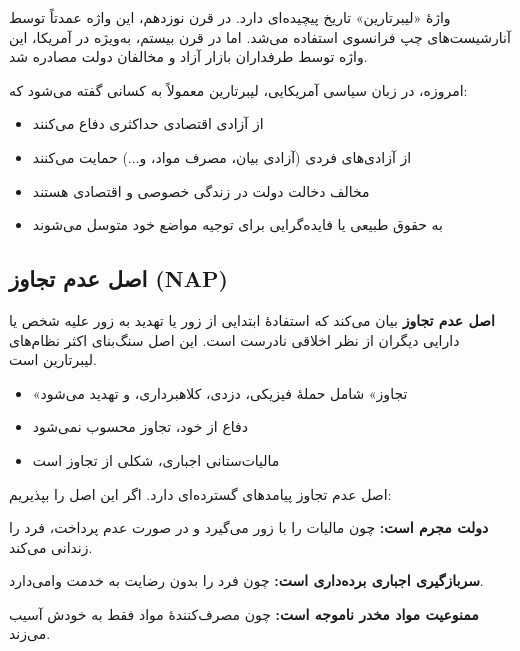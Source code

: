 واژهٔ «لیبرتارین» تاریخ پیچیده‌ای دارد. در قرن نوزدهم، این واژه عمدتاً توسط آنارشیست‌های چپ فرانسوی استفاده می‌شد. اما در قرن بیستم، به‌ویژه در آمریکا، این واژه توسط طرفداران بازار آزاد و مخالفان دولت مصادره شد.

امروزه، در زبان سیاسی آمریکایی، لیبرتارین معمولاً به کسانی گفته می‌شود که:

\begin{itemize}[nosep=2ex, topsep=0.3ex,itemsep=1mm]
    \item از آزادی اقتصادی حداکثری دفاع می‌کنند
    \item از آزادی‌های فردی (آزادی بیان، مصرف مواد، و...) حمایت می‌کنند
    \item مخالف دخالت دولت در زندگی خصوصی و اقتصادی هستند
    \item به حقوق طبیعی یا فایده‌گرایی برای توجیه مواضع خود متوسل می‌شوند
\end{itemize}


\subsection{اصل عدم تجاوز (NAP)}

\begin{tcolorbox}[
    enhanced,
    colback=rightblue!8,
    colframe=rightblue,
    boxrule=1.5pt,
    arc=5pt,
    fonttitle=\bfseries,
    title={\rl{🔵 مفهوم کلیدی: اصل عدم تجاوز}}
]
\textbf{اصل عدم تجاوز}  بیان می‌کند که استفادهٔ ابتدایی از زور یا تهدید به زور علیه شخص یا دارایی دیگران از نظر اخلاقی نادرست است. این اصل سنگ‌بنای اکثر نظام‌های لیبرتارین است.

\begin{itemize}
    \item «تجاوز» شامل حملهٔ فیزیکی، دزدی، کلاهبرداری، و تهدید می‌شود
    \item دفاع از خود، تجاوز محسوب نمی‌شود
    \item مالیات‌ستانی اجباری، شکلی از تجاوز است
\end{itemize}
\end{tcolorbox}


اصل عدم تجاوز پیامدهای گسترده‌ای دارد. اگر این اصل را بپذیریم:

\textbf{دولت مجرم است:} چون مالیات را با زور می‌گیرد و در صورت عدم پرداخت، فرد را زندانی می‌کند.

\textbf{سربازگیری اجباری برده‌داری است:} چون فرد را بدون رضایت به خدمت وا‌می‌دارد.

\textbf{ممنوعیت مواد مخدر ناموجه است:} چون مصرف‌کنندهٔ مواد فقط به خودش آسیب می‌زند.

